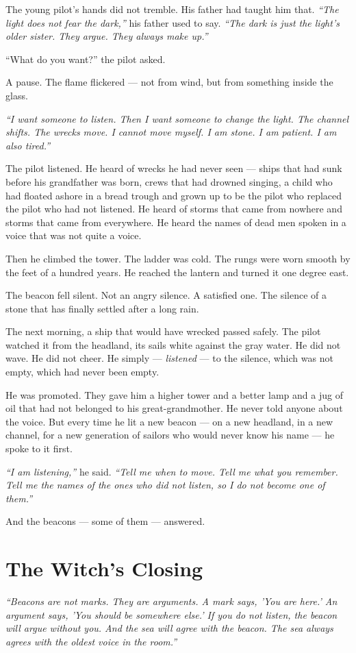 The young pilot's hands did not tremble. His father had taught him that. \textit{``The light does not fear the dark,''} his father used to say. \textit{``The dark is just the light's older sister. They argue. They always make up.''}

``What do you want?'' the pilot asked.

A pause. The flame flickered --- not from wind, but from something inside the glass.

\textit{``I want someone to listen. Then I want someone to change the light. The channel shifts. The wrecks move. I cannot move myself. I am stone. I am patient. I am also tired.''}

The pilot listened. He heard of wrecks he had never seen --- ships that had sunk before his grandfather was born, crews that had drowned singing, a child who had floated ashore in a bread trough and grown up to be the pilot who replaced the pilot who had not listened. He heard of storms that came from nowhere and storms that came from everywhere. He heard the names of dead men spoken in a voice that was not quite a voice.

Then he climbed the tower. The ladder was cold. The rungs were worn smooth by the feet of a hundred years. He reached the lantern and turned it one degree east.

The beacon fell silent. Not an angry silence. A satisfied one. The silence of a stone that has finally settled after a long rain.

The next morning, a ship that would have wrecked passed safely. The pilot watched it from the headland, its sails white against the gray water. He did not wave. He did not cheer. He simply --- \textit{listened} --- to the silence, which was not empty, which had never been empty.

He was promoted. They gave him a higher tower and a better lamp and a jug of oil that had not belonged to his great-grandmother. He never told anyone about the voice. But every time he lit a new beacon --- on a new headland, in a new channel, for a new generation of sailors who would never know his name --- he spoke to it first.

\textit{``I am listening,''} he said. \textit{``Tell me when to move. Tell me what you remember. Tell me the names of the ones who did not listen, so I do not become one of them.''}

And the beacons --- some of them --- answered.

\section*{The Witch's Closing}
\textit{``Beacons are not marks. They are arguments. A mark says, 'You are here.' An argument says, 'You should be somewhere else.' If you do not listen, the beacon will argue without you. And the sea will agree with the beacon. The sea always agrees with the oldest voice in the room.''}

